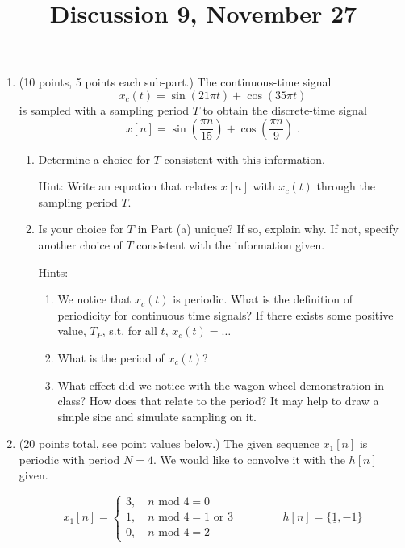 \documentclass[]{siamltex}
\title{Discussion 9, \hspace{1.2cm} November 27}
\begin{document}
%
\maketitle

\begin{enumerate}
\item (10 points, 5 points each sub-part.) The continuous-time signal $$x_c(t) = \sin(21 \pi t ) + \cos (35 \pi t)$$ is sampled with a sampling period $T$ to obtain the discrete-time signal $$x[n] = \sin\left(\frac{\pi n}{15}\right) + \cos\left(\frac{\pi n}{9}\right)\;.$$ 

\vspace{5mm} 
	\begin{enumerate}
	\item Determine a choice for $T$ consistent with this information. 
	
	Hint: Write an equation that relates $x[n]$ with $x_c(t)$ through the sampling period $T$.
	
	\vspace{2cm}
	\item Is your choice for $T$ in Part (a) unique? If so, explain why. If not, specify another choice of $T$ consistent with the information given.
	
	Hints:
		\begin{enumerate}
			\item We notice that $x_c(t)$ is periodic. What is the definition of periodicity for continuous time signals? If there exists some positive value, $T_P$, s.t. for all $t$, $x_c(t)=\ldots$
			\item What is the period of $x_c(t)$?
			\item What effect did we notice with the wagon wheel demonstration in class? How does that relate to the period? It may help to draw a simple sine and simulate sampling on it.
		\end{enumerate}
	\end{enumerate}


\newpage
\item (20 points total, see point values below.) The given sequence $x_1[n]$ is periodic with period $N=4$. We would like to convolve it with the $h[n]$ given. 
\vspace{4mm}

\[x_1[n] = \begin{cases} 3,\quad  n \text{ mod }4 = 0\\ 1,\quad  n \text{ mod }4 = 1 \text{ or } 3\\0,\quad  n\text{ mod }4 = 2 \end{cases}\qquad \qquad h[n] = \{\underline{1},-1\} \]


\end{enumerate}
\end{document}
